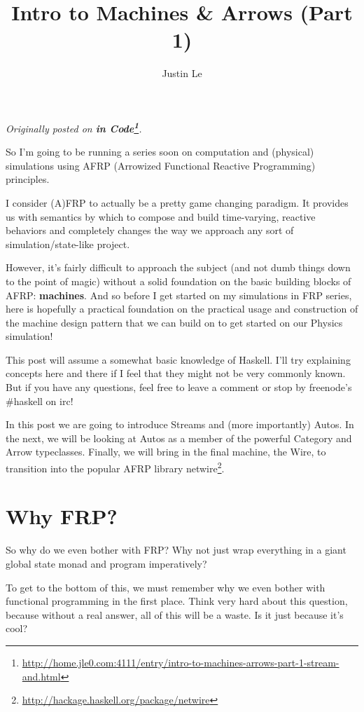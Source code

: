 \documentclass[]{article}
\title{Intro to Machines \& Arrows (Part 1)}
\author{Justin Le}
\renewcommand{\href}[2]{#2\footnote{\url{#1}}}
\begin{document}
\maketitle

\emph{Originally posted on
\textbf{\href{http://home.jle0.com:4111/entry/intro-to-machines-arrows-part-1-stream-and.html}{in
Code}}.}

So I'm going to be running a series soon on computation and (physical)
simulations using AFRP (Arrowized Functional Reactive Programming)
principles.

I consider (A)FRP to actually be a pretty game changing paradigm. It
provides us with semantics by which to compose and build time-varying,
reactive behaviors and completely changes the way we approach any sort
of simulation/state-like project.

However, it's fairly difficult to approach the subject (and not dumb
things down to the point of magic) without a solid foundation on the
basic building blocks of AFRP: \textbf{machines}. And so before I get
started on my simulations in FRP series, here is hopefully a practical
foundation on the practical usage and construction of the machine design
pattern that we can build on to get started on our Physics simulation!

This post will assume a somewhat basic knowledge of Haskell. I'll try
explaining concepts here and there if I feel that they might not be very
commonly known. But if you have any questions, feel free to leave a
comment or stop by freenode's \#haskell on irc!

In this post we are going to introduce Streams and (more importantly)
Autos. In the next, we will be looking at Autos as a member of the
powerful Category and Arrow typeclasses. Finally, we will bring in the
final machine, the Wire, to transition into the popular AFRP library
\href{http://hackage.haskell.org/package/netwire}{netwire}.

\section{Why FRP?}\label{why-frp}

So why do we even bother with FRP? Why not just wrap everything in a
giant global state monad and program imperatively?

To get to the bottom of this, we must remember why we even bother with
functional programming in the first place. Think very hard about this
question, because without a real answer, all of this will be a waste. Is
it just because it's cool?
\end{document}
